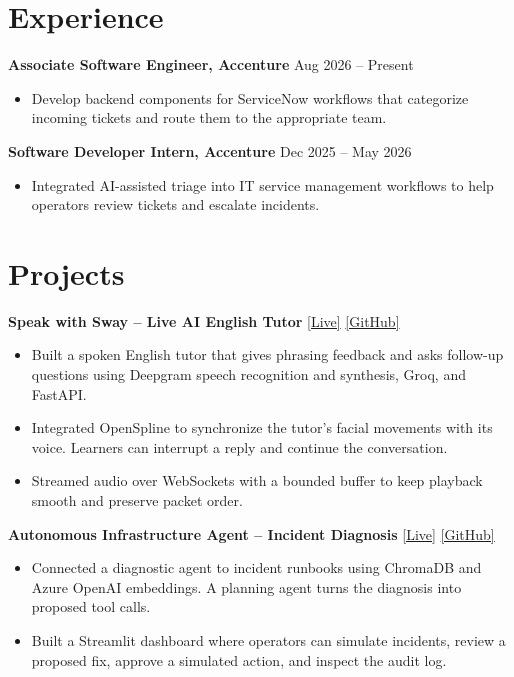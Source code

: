 \documentclass[a4paper,10pt]{article}
\begin{document}

\section*{Experience}

\textbf{Associate Software Engineer, Accenture} \hfill Aug 2026 -- Present
\begin{itemize}
    \item Develop backend components for ServiceNow workflows that categorize incoming tickets and route them to the appropriate team.
\end{itemize}

\textbf{Software Developer Intern, Accenture} \hfill Dec 2025 -- May 2026
\begin{itemize}
    \item Integrated AI-assisted triage into IT service management workflows to help operators review tickets and escalate incidents.
\end{itemize}


\section*{Projects}

\textbf{Speak with Sway -- Live AI English Tutor} \hfill \href{https://speak-with-sway.onrender.com/}{[Live]} \quad \href{https://github.com/Mani1454/speak-with-sway}{[GitHub]}
\begin{itemize}
    \item Built a spoken English tutor that gives phrasing feedback and asks follow-up questions using Deepgram speech recognition and synthesis, Groq, and FastAPI.
    \item Integrated OpenSpline to synchronize the tutor's facial movements with its voice. Learners can interrupt a reply and continue the conversation.
    \item Streamed audio over WebSockets with a bounded buffer to keep playback smooth and preserve packet order.
\end{itemize}

\textbf{Autonomous Infrastructure Agent -- Incident Diagnosis} \hfill \href{https://autonomous-infra-agent.streamlit.app/}{[Live]} \quad \href{https://github.com/Mani1454/autonomous-infra-agent}{[GitHub]}
\begin{itemize}
    \item Connected a diagnostic agent to incident runbooks using ChromaDB and Azure OpenAI embeddings. A planning agent turns the diagnosis into proposed tool calls.
    \item Built a Streamlit dashboard where operators can simulate incidents, review a proposed fix, approve a simulated action, and inspect the audit log.
\end{itemize}
\end{document}
